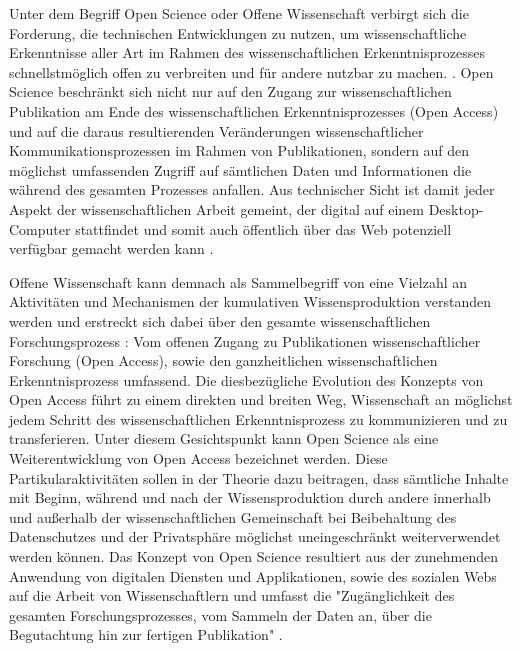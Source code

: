Unter dem Begriff Open Science oder Offene Wissenschaft verbirgt sich die Forderung, die technischen Entwicklungen zu nutzen, um wissenschaftliche Erkenntnisse aller Art im Rahmen des wissenschaftlichen Erkenntnisprozesses schnellstmöglich offen zu verbreiten und für andere nutzbar zu machen. \cite{stafford_2010_science}. Open Science beschränkt sich nicht nur auf den Zugang zur wissenschaftlichen Publikation am Ende des wissenschaftlichen Erkenntnisprozesses (Open Access) und auf die daraus resultierenden Veränderungen wissenschaftlicher Kommunikationsprozessen im Rahmen von Publikationen, sondern auf den möglichst umfassenden Zugriff auf sämtlichen Daten und Informationen die während des gesamten Prozesses anfallen. Aus technischer Sicht ist damit jeder Aspekt der wissenschaftlichen Arbeit gemeint, der digital auf einem Desktop-Computer stattfindet und somit auch öffentlich über das Web potenziell verfügbar gemacht werden kann \cite{mietchen2012wissenschaft}.

Offene Wissenschaft kann demnach als Sammelbegriff von eine Vielzahl an Aktivitäten und Mechanismen der kumulativen Wissensproduktion verstanden werden \cite{Mukherjee_2009} und erstreckt sich dabei über den gesamte wissenschaftlichen Forschungsprozess \cite{Scheliga_2014}: Vom offenen Zugang zu Publikationen wissenschaftlicher Forschung (Open Access), sowie den ganzheitlichen wissenschaftlichen Erkenntnisprozess umfassend. Die diesbezügliche Evolution des Konzepts von Open Access führt zu einem direkten und breiten Weg, Wissenschaft an möglichst jedem Schritt des wissenschaftlichen Erkenntnisprozess zu kommunizieren und zu transferieren. Unter diesem Gesichtspunkt kann Open Science als eine Weiterentwicklung von Open Access bezeichnet werden. Diese Partikularaktivitäten sollen in der Theorie dazu beitragen, dass sämtliche Inhalte mit Beginn, während und nach der Wissensproduktion durch andere innerhalb und außerhalb der wissenschaftlichen Gemeinschaft bei Beibehaltung des Datenschutzes und der Privatsphäre möglichst uneingeschränkt weiterverwendet werden können. Das Konzept von Open Science resultiert aus der zunehmenden Anwendung von digitalen Diensten und Applikationen, sowie des sozialen Webs auf die Arbeit von Wissenschaftlern und umfasst die "Zugänglichkeit des gesamten Forschungsprozesses, vom Sammeln der Daten an, über die Begutachtung hin zur fertigen Publikation" \cite{brembs2015open}.

